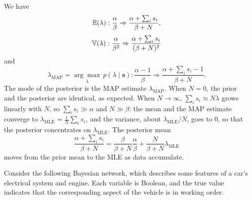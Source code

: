 \documentclass[11pt, a4paper]{exam}
\begin{document}
\begin{exercises}[1, 2][5]
\begin{parts}
    \begin{solution}
        We have
        \[
            \mathbb{E}(\lambda): \dfrac{\alpha}{\beta} \Rightarrow \dfrac{\alpha + \sum_i s_i}{\beta + N},
        \]
        \[
            \mathbb{V}(\lambda): \dfrac{\alpha}{\beta^2} \Rightarrow \dfrac{\alpha + \sum_i s_i}{(\beta + N)^2}
        \]
        and
        \[
            \lambda_{\text{MAP}} = \underset{\lambda}{\arg \max}\, p(\lambda \mid \mathbf{s}): \dfrac{\alpha - 1}{\beta} \Rightarrow \dfrac{\alpha + \sum_i s_i - 1}{\beta + N}.
        \]
        The mode of the posterior is the MAP estimate $\lambda_{\text{MAP}}$. When $N = 0$, the prior and the posterior are identical, as expected. When $N \to \infty$, $\sum_i s_i \approx N \lambda$ grows linearly with $N$, so $\sum_i s_i \gg \alpha$ and $N \gg \beta$: the mean and the MAP estimate converge to $\lambda_{\text{MLE}} = \frac{1}{N} \sum_i s_i$, and the variance, about $\lambda_{\text{MLE}} / N$, goes to 0, so that the posterior concentrates on $\lambda_{\text{MLE}}$. The posterior mean
        \[
            \frac{\alpha + \sum_i s_i}{\beta + N} = \frac{\beta}{\beta + N} \frac{\alpha}{\beta} + \frac{N}{\beta + N} \lambda_{\text{MLE}}
        \]
        moves from the prior mean to the MLE as data accumulate.
    \end{solution}
\end{parts}


Consider the following Bayesian network, which describes some features of a car's electrical system and engine. Each variable is Boolean, and the true value indicates that the corresponding aspect of the vehicle is in working order.

\begin{center}
\end{center}


\end{exercises}
\end{document}
